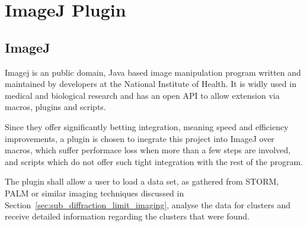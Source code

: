 
\section{ImageJ Plugin}
\label{sec:imagej_plugin}

\subsection{ImageJ}
\label{sub:imagej}

Imagej is an public domain, Java based image manipulation program written and
maintained by developers at the National Institute of Health. It is widly used
in medical and biological research and has an open API to allow extension via
macros, plugins and scripts.

Since they offer significantly betting integration, meaning speed and
efficiency improvements, a plugin is chosen to inegrate this project into
ImageJ over macros, which suffer performace loss when more than a few steps are
involved, and scripts which do not offer such tight integration with the rest of
the program.

The plugin shall allow a user to load a data set, as gathered from STORM, PALM
or similar imaging techniques discussed in
Section~\ref{sec:sub_diffraction_limit_imaging}, analyse the data for clusters
and receive detailed information regarding the clusters that were found.
